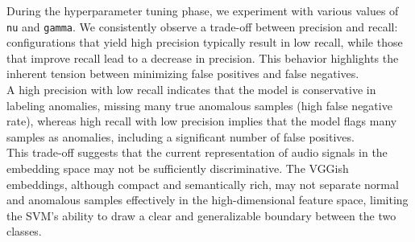 \documentclass[ngerman]{scrartcl}
\begin{document}
During the hyperparameter tuning phase, we experiment with various values of \texttt{nu} and \texttt{gamma}. We consistently observe a trade-off between precision and recall: configurations that yield high precision typically result in low recall, while those that improve recall lead to a decrease in precision. This behavior highlights the inherent tension between minimizing false positives and false negatives.\\ 
A high precision with low recall indicates that the model is conservative in labeling anomalies, missing many true anomalous samples (high false negative rate), whereas high recall with low precision implies that the model flags many samples as anomalies, including a significant number of false positives.\\
This trade-off suggests that the current representation of audio signals in the embedding space may not be sufficiently discriminative. The VGGish embeddings, although compact and semantically rich, may not separate normal and anomalous samples effectively in the high-dimensional feature space, limiting the SVM's ability to draw a clear and generalizable boundary between the two classes.
\end{document}
